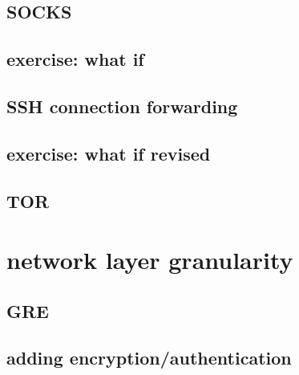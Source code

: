 
\subsection{SOCKS}


\subsection{exercise: what if}


\subsection{SSH connection forwarding}


\subsection{exercise: what if revised}


\subsection{TOR}

\section{network layer granularity}




\subsection{GRE}



\subsection{adding encryption/authentication}


